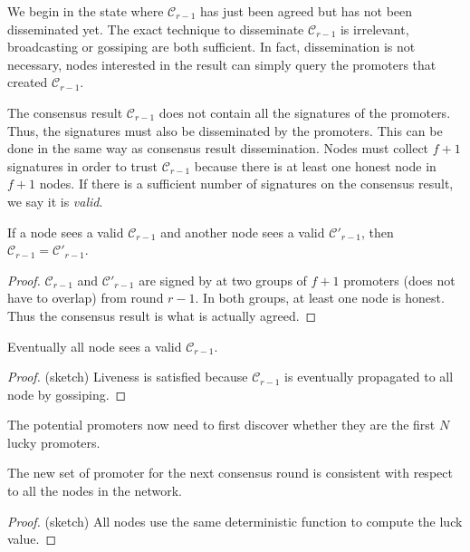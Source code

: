 We begin in the state where $\mathcal{C}_{r-1}$ has just been agreed but has not
been disseminated yet. The exact technique to disseminate $\mathcal{C}_{r-1}$ is
irrelevant, broadcasting or gossiping are both sufficient. In fact,
dissemination is not necessary, nodes interested in the result can simply query
the promoters that created $\mathcal{C}_{r-1}$.

The consensus result $\mathcal{C}_{r-1}$ does not contain all the signatures of
the promoters. Thus, the signatures must also be disseminated by the promoters.
This can be done in the same way as consensus result dissemination. Nodes must
collect $f + 1$ signatures in order to trust $\mathcal{C}_{r-1}$ because there
is at least one honest node in $f + 1$ nodes. If there is a sufficient number of
signatures on the consensus result, we say it is \emph{valid}.

\begin{lemma}\label{lem:con_consistent}
  If a node sees a valid $\mathcal{C}_{r-1}$ and another node sees a valid
  $\mathcal{C}'_{r-1}$, then $\mathcal{C}_{r-1} = \mathcal{C}'_{r-1}$.
\end{lemma}
\begin{proof}
  $\mathcal{C}_{r-1}$ and $\mathcal{C}'_{r-1}$ are signed by at two groups of $f
  + 1$ promoters (does not have to overlap) from round $r-1$. In both groups, at
  least one node is honest. Thus the consensus result is what is actually
  agreed.
\end{proof}

\begin{lemma}\label{lem:con_alive}
  Eventually all node sees a valid $\mathcal{C}_{r-1}.$  
\end{lemma}
\begin{proof}
  (sketch) Liveness is satisfied because $\mathcal{C}_{r-1}$ is eventually propagated to
  all node by gossiping.
\end{proof}

The potential promoters now need to first discover whether
they are the first $N$ lucky promoters.

\begin{lemma}\label{lem:promoter_consistent}
  The new set of promoter for the next consensus round is consistent with
  respect to all the nodes in the network.
\end{lemma}
\begin{proof}
  (sketch) All nodes use the same deterministic function to compute the luck
  value.
\end{proof}

